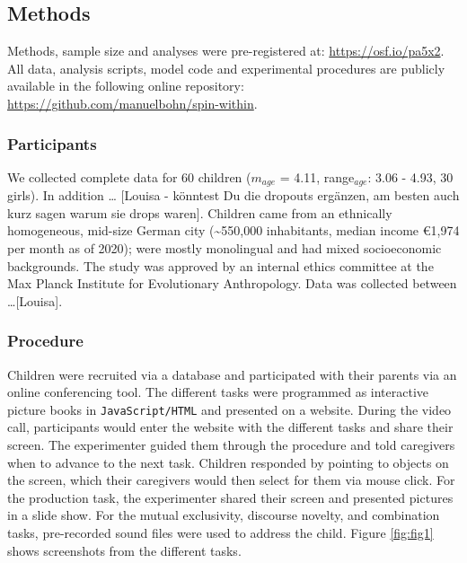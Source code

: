 \documentclass[
  man,floatsintext]{apa6}
\begin{document}
\hypertarget{methods}{%
\subsection{Methods}\label{methods}}

Methods, sample size and analyses were pre-registered at: \url{https://osf.io/pa5x2}. All data, analysis scripts, model code and experimental procedures are publicly available in the following online repository: \url{https://github.com/manuelbohn/spin-within}.

\hypertarget{participants}{%
\subsubsection{Participants}\label{participants}}

We collected complete data for 60 children (\(m_{age}\) = 4.11, range\(_{age}\): 3.06 - 4.93, 30 girls). In addition \ldots{} {[}Louisa - könntest Du die dropouts ergänzen, am besten auch kurz sagen warum sie drops waren{]}. Children came from an ethnically homogeneous, mid-size German city (\textasciitilde550,000 inhabitants, median income €1,974 per month as of 2020); were mostly monolingual and had mixed socioeconomic backgrounds. The study was approved by an internal ethics committee at the Max Planck Institute for Evolutionary Anthropology. Data was collected between \ldots{[}Louisa{]}.

\hypertarget{procedure}{%
\subsubsection{Procedure}\label{procedure}}

Children were recruited via a database and participated with their parents via an online conferencing tool. The different tasks were programmed as interactive picture books in \texttt{JavaScript/HTML} and presented on a website. During the video call, participants would enter the website with the different tasks and share their screen. The experimenter guided them through the procedure and told caregivers when to advance to the next task. Children responded by pointing to objects on the screen, which their caregivers would then select for them via mouse click. For the production task, the experimenter shared their screen and presented pictures in a slide show. For the mutual exclusivity, discourse novelty, and combination tasks, pre-recorded sound files were used to address the child. Figure \ref{fig:fig1} shows screenshots from the different tasks.
\end{document}
